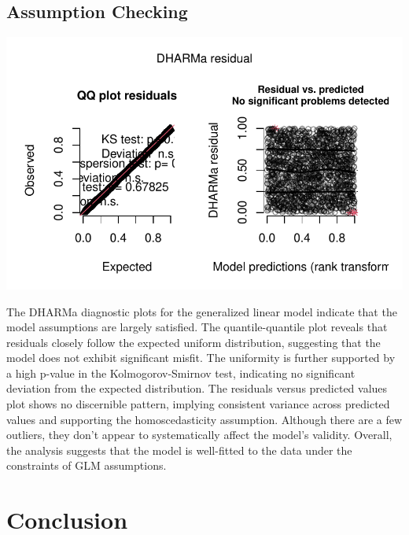 \documentclass[
  11pt,
]{article}
\begin{document}
\hypertarget{assumption-checking}{%
\subsection{Assumption Checking}\label{assumption-checking}}

\includegraphics{Group_07_Analysis_files/figure-pdf/unnamed-chunk-35-1.pdf}

The DHARMa diagnostic plots for the generalized linear model indicate
that the model assumptions are largely satisfied. The quantile-quantile
plot reveals that residuals closely follow the expected uniform
distribution, suggesting that the model does not exhibit significant
misfit. The uniformity is further supported by a high p-value in the
Kolmogorov-Smirnov test, indicating no significant deviation from the
expected distribution. The residuals versus predicted values plot shows
no discernible pattern, implying consistent variance across predicted
values and supporting the homoscedasticity assumption. Although there
are a few outliers, they don't appear to systematically affect the
model's validity. Overall, the analysis suggests that the model is
well-fitted to the data under the constraints of GLM assumptions.

\hypertarget{conclusion}{%
\section{Conclusion}\label{conclusion}}
\end{document}
